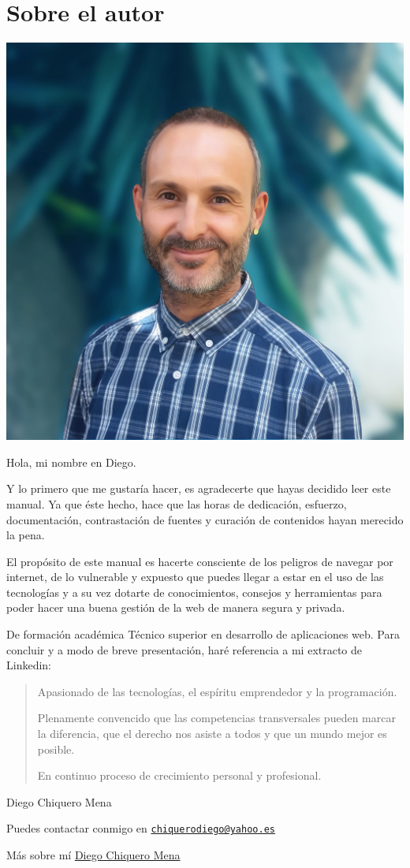 \documentclass[
  spanish,
  a4paper,
  openany]{book}
\begin{document}
\hypertarget{autor}{%
\chapter*{Sobre el autor}\label{autor}}

\begin{flushleft}\includegraphics[width=0.25\linewidth]{images/diego-chiquero-2020-profile} \end{flushleft}

Hola, mi nombre en Diego.

Y lo primero que me gustaría hacer, es agradecerte que hayas decidido leer este manual. Ya que éste hecho, hace que las horas de dedicación, esfuerzo, documentación, contrastación de fuentes y curación de contenidos hayan merecido la pena.

El propósito de este manual es hacerte consciente de los peligros de navegar por internet, de lo vulnerable y expuesto que puedes llegar a estar en el uso de las tecnologías y a su vez dotarte de conocimientos, consejos y herramientas para poder hacer una buena gestión de la web de manera segura y privada.

De formación académica Técnico superior en desarrollo de aplicaciones web.
Para concluir y a modo de breve presentación, haré referencia a mi extracto de Linkedin:

\begin{quote}
Apasionado de las tecnologías, el espíritu emprendedor y la programación.

Plenamente convencido que las competencias transversales pueden marcar la diferencia, que el derecho nos asiste a todos y que un mundo mejor es posible.

En continuo proceso de crecimiento personal y profesional.
\end{quote}

Diego Chiquero Mena

Puedes contactar conmigo en \href{mailto:chiquerodiego@yahoo.es}{\nolinkurl{chiquerodiego@yahoo.es}}

Más sobre mí \href{https://about.me/diegochiquero}{Diego Chiquero Mena}
\end{document}
